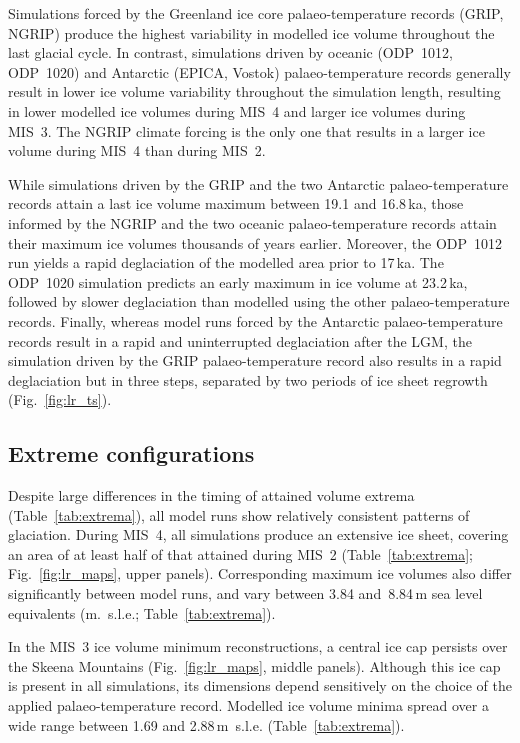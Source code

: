 \documentclass[tc, manuscript]{copernicus}
\begin{document}
Simulations forced by the Greenland ice core palaeo-temperature
records (GRIP, NGRIP) produce the highest variability in modelled ice volume
throughout the last glacial cycle. In contrast, simulations driven by oceanic
(ODP~1012, ODP~1020) and Antarctic (EPICA, Vostok) palaeo-temperature records
generally result in lower ice volume variability throughout the simulation
length, resulting in lower modelled ice volumes during MIS~4 and larger ice
volumes during MIS~3. The NGRIP climate forcing is the only one
that results in a larger ice volume during MIS~4 than during MIS~2.

While simulations driven by the GRIP and the two Antarctic palaeo-temperature
records attain a last ice volume maximum between 19.1 and 16.8\,ka, those
informed by the NGRIP and the two oceanic palaeo-temperature records attain their
maximum ice volumes thousands of years earlier. Moreover, the ODP~1012 run
yields a rapid deglaciation of the modelled area prior to 17\,ka. The ODP~1020
simulation predicts an early maximum in ice volume at 23.2\,ka, followed by
slower deglaciation than modelled using the other palaeo-temperature records.
Finally, whereas model runs forced by the Antarctic palaeo-temperature records
result in a rapid and uninterrupted deglaciation after the LGM, the
simulation driven by the GRIP palaeo-temperature record also results in a rapid
deglaciation but in three steps, separated by two periods of ice sheet regrowth
(Fig.~\ref{fig:lr_ts}).

\subsection{Extreme configurations}

Despite large differences in the timing of attained volume extrema
(Table~\ref{tab:extrema}), all model runs show relatively consistent
patterns of glaciation. During MIS~4, all simulations produce an extensive ice
sheet, covering an area of at least half of that attained during MIS~2
(Table~\ref{tab:extrema}; Fig.~\ref{fig:lr_maps}, upper panels).
Corresponding maximum ice volumes also differ significantly between model runs,
and vary between 3.84 and~8.84\,m sea level equivalents (m.~s.l.e.;
Table~\ref{tab:extrema}).

In the MIS~3 ice volume minimum reconstructions, a central ice cap persists
over the Skeena
Mountains (Fig.~\ref{fig:lr_maps}, middle panels). Although this ice cap is
present in all simulations, its dimensions depend sensitively on the choice of
the applied palaeo-temperature record. Modelled ice volume minima spread over a
wide range between 1.69 and 2.88\,m~s.l.e. (Table~\ref{tab:extrema}).
\end{document}

